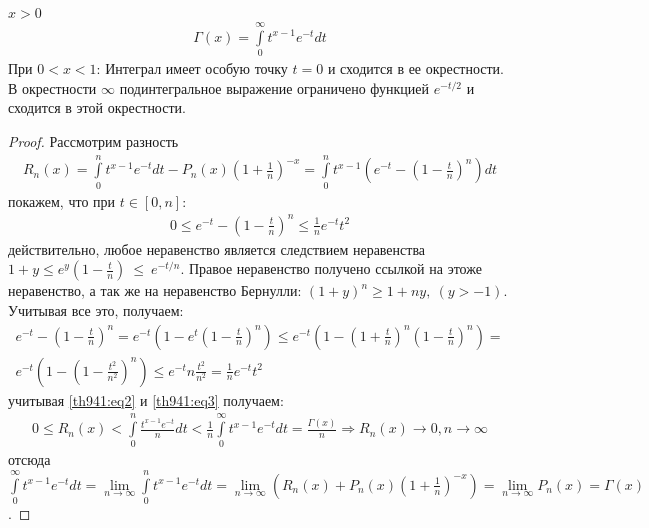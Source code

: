\begin{theorem}
  \label{th941}
  $x > 0$
  \begin{gather}
    \Gamma(x) = \int\limits_0^\infty t^{x-1} e^{-t} dt
    \label{th941:eq1}
  \end{gather}
  При $0 < x < 1$: Интеграл имеет особую точку $t = 0$ и сходится в ее
  окрестности. В окрестности $\infty$ подинтегральное выражение ограничено
  функцией $e^{-t/2}$ и сходится в этой окрестности.
\end{theorem}

\begin{proof}
  Рассмотрим разность
  \begin{gather}
    R_n(x) = \int\limits_0^n t^{x-1} e^{-t} dt - P_n(x) \left(1 +
    \frac{1}{n}\right)^{-x} = \int\limits_0^n t^{x - 1} \left( e^{-t} - \left(
    1 - \frac{t}{n} \right)^n \right) dt
    \label{th941:eq2}
  \end{gather}
  покажем, что при $t \in [0, n]$:
  \begin{gather}
    0 \leq e^{-t} - \left( 1 - \frac{t}{n} \right)^n \leq \frac{1}{n} e^{-t}
    t^2
    \label{th941:eq3}
  \end{gather}
  действительно, любое неравенство является следствием неравенства $1 + y \leq
  e^y\left( 1 - \frac{t}{n} \right)~\leq~e^{-t/n}$. Правое неравенство получено
  ссылкой на этоже неравенство, а так же на неравенство Бернулли:
  $(1 + y)^n \geq 1 + ny, \ (y > -1)$. Учитывая все это, получаем:
  \begin{gather*}
    e^{-t} - \left( 1 - \frac{t}{n} \right)^n = e^{-t}\left( 1 - e^t\left( 1 -
    \frac{t}{n} \right)^n \right) \leq e^{-t} \left( 1 - \left( 1 + \frac{t}{n}
    \right)^n \left( 1 - \frac{t}{n} \right)^n \right) = \\
    e^{-t} \left( 1 - \left( 1 - \frac{t^2}{n^2} \right)^n \right) \leq e^{-t}
    n\frac{t^2}{n^2} = \frac{1}{n} e^{-t} t^2
  \end{gather*}
  учитывая \eqref{th941:eq2} и \eqref{th941:eq3} получаем:
  \begin{gather*}
    0 \leq R_n(x) < \int\limits_0^n \frac{t^{x-1}e^{-t}}{n} dt <
    \frac{1}{n}\int\limits_0^\infty t^{x-1} e^{-t} dt = \frac{\Gamma(x)}{n}
    \Rightarrow R_n(x) \to 0, n \to \infty
  \end{gather*}
  отсюда $\int\limits_0^\infty t^{x-1} e^{-t} dt = \lim\limits_{n \to \infty}
  \int\limits_0^n t^{x-1} e^{-t} dt = \lim\limits_{n \to \infty} \left( R_n(x)
  + P_n(x) \left( 1 + \frac{1}{n} \right)^{-x} \right) = \lim\limits_{n \to
  \infty} P_n(x) = \Gamma(x)$.
\end{proof}


